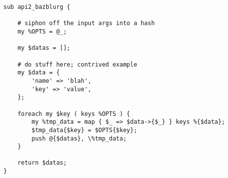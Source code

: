 \begin{verbatim}
sub api2_bazblurg {

    # siphon off the input args into a hash
    my %OPTS = @_;

    my $datas = [];

    # do stuff here; contrived example
    my $data = {
        'name' => 'blah',
        'key' => 'value',
    };

    foreach my $key ( keys %OPTS ) {
        my %tmp_data = map { $_ => $data->{$_} } keys %{$data};
        $tmp_data{$key} = $OPTS{$key};
        push @{$datas}, \%tmp_data;
    }

    return $datas;
}
\end{verbatim}

